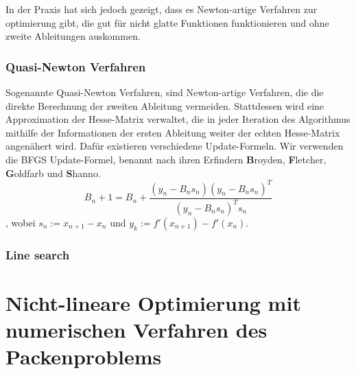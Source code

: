 \documentclass[runningheads,a4paper]{llncs}
\begin{document}
In der Praxis hat sich jedoch gezeigt, dass es Newton-artige Verfahren zur optimierung gibt, die gut für nicht glatte Funktionen funktionieren \cite{DBLP:journals/mp/LewisO13} und ohne zweite Ableitungen auskommen.

\subsubsection{Quasi-Newton Verfahren}

Sogenannte Quasi-Newton Verfahren, sind Newton-artige Verfahren, die die direkte Berechnung der zweiten Ableitung vermeiden. Stattdessen wird eine Approximation der Hesse-Matrix verwaltet, die in jeder Iteration des Algorithmus mithilfe der Informationen der ersten Ableitung weiter der echten Hesse-Matrix angenähert wird. Dafür existieren verschiedene Update-Formeln. Wir verwenden die BFGS Update-Formel, benannt nach ihren Erfindern \textbf{B}royden, \textbf{F}letcher, \textbf{G}oldfarb und \textbf{S}hanno.
\begin{equation*}
B_n+1 = B_n + \frac{(y_n- B_ns_n) (y_n-B_ns_n)^T}{(y_n- B_n s_n)^T s_n}
\end{equation*}
, wobei $s_n := x_{n+1} - x_n$ und $y_k := f'(x_{n+1}) - f'(x_n)$.

\subsubsection{Line search}


\section{Nicht-lineare Optimierung mit numerischen Verfahren des Packenproblems}
{}

\end{document}
